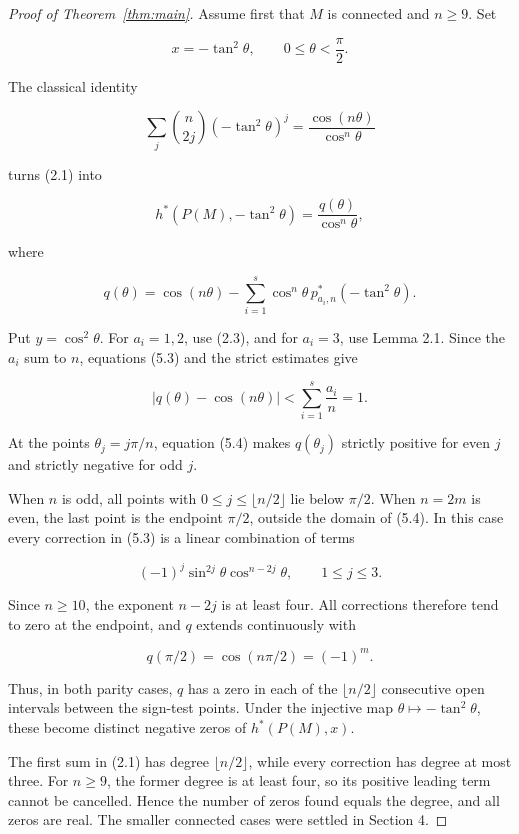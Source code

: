 \documentclass[11pt]{article}
\begin{document}
\begin{proof}[Proof of Theorem~\ref{thm:main}]

Assume first that $M$ is connected and $n\ge9$. Set

\[
x=-\tan^2\theta,\qquad 0\le\theta<\frac{\pi}{2}.
\]

The classical identity

\[
\sum_j\binom n{2j}(-\tan^2\theta)^j
=\frac{\cos(n\theta)}{\cos^n\theta}                                \tag{5.1}
\]

turns (2.1) into

\[
h^*(P(M),-\tan^2\theta)=\frac{q(\theta)}{\cos^n\theta},             \tag{5.2}
\]

where

\[
q(\theta)=\cos(n\theta)
-\sum_{i=1}^s\cos^n\theta\,
  p^*_{a_i,n}(-\tan^2\theta).                                      \tag{5.3}
\]

Put $y=\cos^2\theta$. For $a_i=1,2$, use (2.3), and for $a_i=3$,
use Lemma 2.1. Since the $a_i$ sum to $n$, equations (5.3) and the strict
estimates give

\[
|q(\theta)-\cos(n\theta)|
<\sum_{i=1}^s\frac{a_i}{n}=1.                                     \tag{5.4}
\]

At the points $\theta_j=j\pi/n$, equation (5.4) makes $q(\theta_j)$
strictly positive for even $j$ and strictly negative for odd $j$.

When $n$ is odd, all points with
$0\le j\le\lfloor n/2\rfloor$ lie below $\pi/2$. When $n=2m$ is
even, the last point is the endpoint $\pi/2$, outside the domain of (5.4).
In this case every correction in (5.3) is a linear combination of terms

\[
(-1)^j\sin^{2j}\theta\cos^{n-2j}\theta,
\qquad 1\le j\le3.
\]

Since $n\ge10$, the exponent $n-2j$ is at least four. All corrections
therefore tend to zero at the endpoint, and $q$ extends continuously with

\[
q(\pi/2)=\cos(n\pi/2)=(-1)^m.
\]

Thus, in both parity cases, $q$ has a zero in each of the
$\lfloor n/2\rfloor$ consecutive open intervals between the sign-test
points. Under the injective map
$\theta\mapsto-\tan^2\theta$, these become distinct negative zeros of
$h^*(P(M),x)$.

The first sum in (2.1) has degree $\lfloor n/2\rfloor$, while every
correction has degree at most three. For $n\ge9$, the former degree is at
least four, so its positive leading term cannot be cancelled. Hence the
number of zeros found equals the degree, and all zeros are real. The smaller
connected cases were settled in Section 4.


\end{proof}
\end{document}
